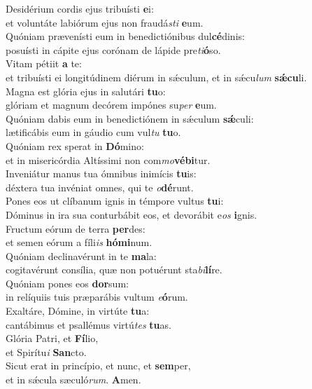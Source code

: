 \evenverse Desidérium cordis ejus tribuísti \textbf{e}i:~\*\\
\evenverse et voluntáte labiórum ejus non fraudá\textit{sti} \textbf{e}um.\\
\oddverse Quóniam prævenísti eum in benedictiónibus dul\textbf{cé}dinis:~\*\\
\oddverse posuísti in cápite ejus corónam de lápide pre\textit{ti}\textbf{ó}so.\\
\evenverse Vitam pétiit \textbf{a} te:~\*\\
\evenverse et tribuísti ei longitúdinem diérum in sǽculum, et in sǽcu\textit{lum} \textbf{sǽ}\textbf{cu}li.\\
\oddverse Magna est glória ejus in salutári \textbf{tu}o:~\*\\
\oddverse glóriam et magnum decórem impónes su\textit{per} \textbf{e}um.\\
\evenverse Quóniam dabis eum in benedictiónem in sǽculum \textbf{sǽ}culi:~\*\\
\evenverse lætificábis eum in gáudio cum vul\textit{tu} \textbf{tu}o.\\
\oddverse Quóniam rex sperat in \textbf{Dó}mino:~\*\\
\oddverse et in misericórdia Altíssimi non com\textit{mo}\textbf{vé}\textbf{bi}tur.\\
\evenverse Inveniátur manus tua ómnibus inimícis \textbf{tu}is:~\*\\
\evenverse déxtera tua invéniat omnes, qui te \textit{o}\textbf{dé}runt.\\
\oddverse Pones eos ut clíbanum ignis in témpore vultus \textbf{tu}i:~\*\\
\oddverse Dóminus in ira sua conturbábit eos, et devorábit e\textit{os} \textbf{i}gnis.\\
\evenverse Fructum eórum de terra \textbf{per}des:~\*\\
\evenverse et semen eórum a fíli\textit{is} \textbf{hó}\textbf{mi}num.\\
\oddverse Quóniam declinavérunt in te \textbf{ma}la:~\*\\
\oddverse cogitavérunt consília, quæ non potuérunt sta\textit{bi}\textbf{lí}re.\\
\evenverse Quóniam pones eos \textbf{dor}sum:~\*\\
\evenverse in relíquiis tuis præparábis vultum \textit{e}\textbf{ó}rum.\\
\oddverse Exaltáre, Dómine, in virtúte \textbf{tu}a:~\*\\
\oddverse cantábimus et psallémus virtú\textit{tes} \textbf{tu}as.\\
\evenverse Glória Patri, et \textbf{Fí}lio,~\*\\
\evenverse et Spirítu\textit{i} \textbf{San}cto.\\
\oddverse Sicut erat in princípio, et nunc, et \textbf{sem}per,~\*\\
\oddverse et in sǽcula sæculó\textit{rum}. \textbf{A}men.\\
